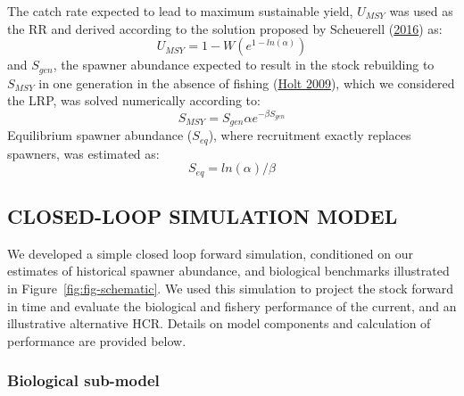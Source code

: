 \documentclass[11pt]{book}
\begin{document}
The catch rate expected to lead to maximum sustainable yield, \(U_{MSY}\) was used as the RR and derived according to the solution proposed by Scheuerell (\protect\hyperlink{ref-scheuerellExplicitSolutionCalculating2016}{2016}) as:
\begin{equation}
U_{MSY} = 1 - W(e^{1-ln(\alpha)})
\label{eq:get-Umsy}
\end{equation}
and \(S_{gen}\), the spawner abundance expected to result in the stock rebuilding to \(S_{MSY}\) in one generation in the absence of fishing (\protect\hyperlink{ref-holtEvaluationBenchmarksConservation2009}{Holt 2009}), which we considered the LRP, was solved numerically according to:
\begin{equation}
S_{MSY} = S_{gen}\alpha e^{-\beta S_{gen}}
\label{eq:get-Sgen}
\end{equation}
Equilibrium spawner abundance (\(S_{eq}\)), where recruitment exactly replaces spawners, was estimated as:
\begin{equation}
S_{eq} = ln(\alpha)/\beta
\label{eq:get-Seq}
\end{equation}
\hypertarget{closed-loop-simulation-model}{%
\subsection{CLOSED-LOOP SIMULATION MODEL}\label{closed-loop-simulation-model}}

We developed a simple closed loop forward simulation, conditioned on our estimates of historical spawner abundance, and biological benchmarks illustrated in Figure~\ref{fig:fig-schematic}. We used this simulation to project the stock forward in time and evaluate the biological and fishery performance of the current, and an illustrative alternative HCR. Details on model components and calculation of performance are provided below.

\hypertarget{biological-sub-model}{%
\subsubsection{Biological sub-model}\label{biological-sub-model}}
\end{document}
